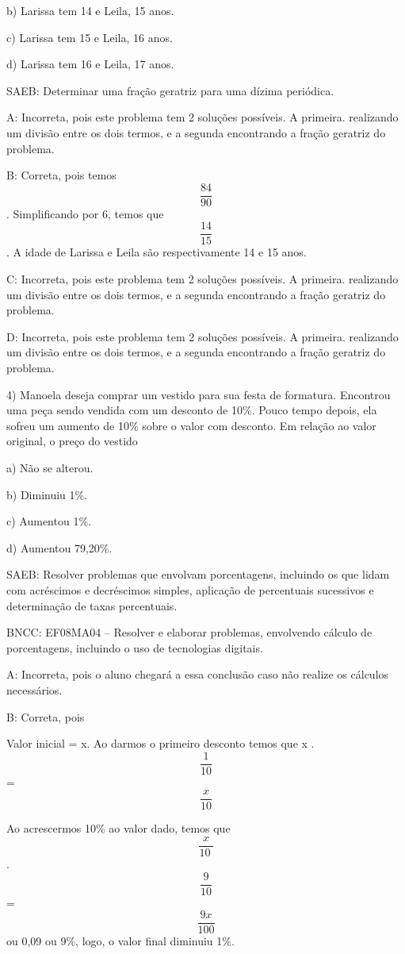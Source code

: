 b) Larissa tem 14 e Leila, 15 anos.

c) Larissa tem 15 e Leila, 16 anos.

d) Larissa tem 16 e Leila, 17 anos.

SAEB: Determinar uma fração geratriz para uma dízima periódica.

A: Incorreta, pois este problema tem 2 soluções possíveis. A primeira.
realizando um divisão entre os dois termos, e a segunda encontrando a
fração geratriz do problema.

B: Correta, pois temos \[\frac{84}{90}\]. Simplificando por 6, temos que
\[\frac{14}{15}\]. A idade de Larissa e Leila são respectivamente 14 e
15 anos.

C: Incorreta, pois este problema tem 2 soluções possíveis. A primeira.
realizando um divisão entre os dois termos, e a segunda encontrando a
fração geratriz do problema.

D: Incorreta, pois este problema tem 2 soluções possíveis. A primeira.
realizando um divisão entre os dois termos, e a segunda encontrando a
fração geratriz do problema.

4) Manoela deseja comprar um vestido para sua festa de formatura.
Encontrou uma peça sendo vendida com um desconto de 10\%. Pouco tempo
depois, ela sofreu um aumento de 10\% sobre o valor com desconto. Em
relação ao valor original, o preço do vestido

a) Não se alterou.

b) Diminuiu 1\%.

c) Aumentou 1\%.

d) Aumentou 79,20\%.

SAEB: Resolver problemas que envolvam porcentagens, incluindo os que
lidam com acréscimos e decréscimos simples, aplicação de percentuais
sucessivos e determinação de taxas percentuais.

BNCC: EF08MA04 -- Resolver e elaborar problemas, envolvendo cálculo de
porcentagens, incluindo o uso de tecnologias digitais.

A: Incorreta, pois o aluno chegará a essa conclusão caso não realize os
cálculos necessários.

B: Correta, pois

Valor inicial = x. Ao darmos o primeiro desconto temos que x .
\[\frac{1}{10}\] = \[\frac{x}{10}\]

Ao acrescermos 10\% ao valor dado, temos que \[\frac{x}{10\ }\] .
\[\frac{9}{10}\] = \[\frac{9x}{100}\] ou 0,09 ou 9\%, logo, o valor
final diminuiu 1\%.

